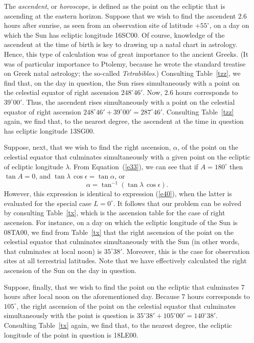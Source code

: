  The {\em ascendent}, or  {\em horoscope}, is defined as the point on the ecliptic that is ascending at the eastern horizon.
 Suppose that we wish to find the  ascendent $2.6$ hours after 
 sunrise, as seen from an observation site of latitude $+55^\circ$, on a day
 on which the Sun has ecliptic longitude 16SC00. Of course, knowledge
 of the ascendent at the time of birth is key to drawing up a natal chart
 in astrology. Hence, this type of calculation was of great importance to the ancient Greeks. (It was of particular importance to Ptolemy, because he wrote the standard treatise on Greek natal
 astrology; the so-called {\em Tetrabiblos}.) 
 Consulting Table~\ref{tzz}, we find that, on the day in question, the Sun rises simultaneously with a point on the celestial equator of
 right ascension $248^\circ 46'$. Now, $2.6$ hours corresponds to
 $39^\circ00'$. Thus, the ascendent rises simultaneously with a point
 on the celestial equator of right ascension $248^\circ 46' + 39^\circ00'=
 287^\circ 46'$. Consulting Table~\ref{tzz} again, we find that, to the
 nearest degree, the ascendent at the time in question has ecliptic longitude 13SG00. 
 
Suppose, next, that we wish to find the right ascension, $\alpha$, of the point on the celestial equator
that culminates simultaneously with a given point on the ecliptic of
ecliptic longitude $\lambda$.
From Equation~(\ref{e33}), we can see that if $A=180^\circ$ then
$\tan A = 0$, and $\tan\lambda\,\cos \epsilon = \tan \alpha$, or
\begin{equation}
\alpha  = \tan ^{-1}(\tan \lambda\,\cos\epsilon).
\end{equation}
However, this expression is identical to expression (\ref{e40}),
when the latter is evaluated for the special case $L=0^\circ$. It follows
that our problem can be solved by consulting Table~\ref{tx}, which is the
ascension table for the case of right ascension. For instance, on a day on which the ecliptic
longitude of the Sun is 08TA00, we find from Table~\ref{tx} that
the right ascension of the point on the celestial equator that culminates
simultaneously with the Sun (in other words,  that culminates at local noon) is $35^\circ38'$. Moreover, this is the case
for observation sites at all terrestrial latitudes. Note that we have effectively
calculated the right ascension of the Sun on the day in question.

Suppose, finally, that we wish to find the  point on the
ecliptic that culminates 7 hours after local noon on the
aforementioned day. Because 7 hours corresponds to $105^\circ$, the
right ascension of the point on the celestial equator that culminates
simultaneously with the point is question is $35^\circ 38' + 105^\circ00'= 
 140^\circ 38'$. Consulting Table~\ref{tx} again, we find that, to the nearest degree,  the
 ecliptic longitude of the point in question is 18LE00.
 
